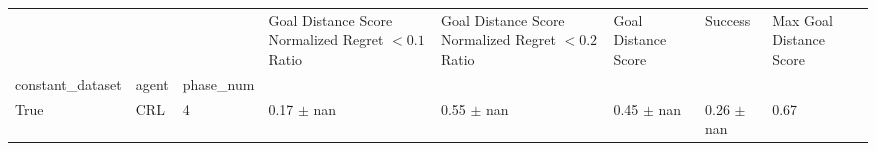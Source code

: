 \begin{tabular}{llllllll}
\toprule
 &  &  & Goal Distance Score Normalized Regret $< 0.1$ Ratio & Goal Distance Score Normalized Regret $< 0.2$ Ratio & Goal Distance Score & Success & Max Goal Distance Score \\
constant_dataset & agent & phase_num &  &  &  &  &  \\
\midrule
True & CRL & 4 & 0.17 $\pm$ nan & 0.55 $\pm$ nan & 0.45 $\pm$ nan & 0.26 $\pm$ nan & 0.67 \\
\cline{1-8} \cline{2-8}
\bottomrule
\end{tabular}
